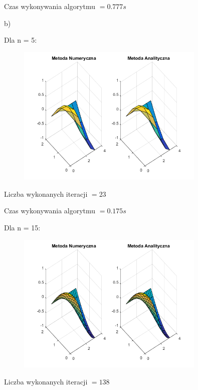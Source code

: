 Czas wykonywania algorytmu $ = 0.777 s$

b)

Dla n = 5:

\begin{figure}[!ht]
	\begin{center}
		\includegraphics[width=0.8\textwidth]{Lab6/charts/jacobi/zad2/5.png}
	\end{center}
\end{figure}

Liczba wykonanych iteracji $ = 23 $

Czas wykonywania algorytmu $ = 0.175 s$

Dla n = 15:

\begin{figure}[!ht]
	\begin{center}
		\includegraphics[width=0.8\textwidth]{Lab6/charts/jacobi/zad2/15.png}
	\end{center}
\end{figure}

Liczba wykonanych iteracji $ = 138 $

